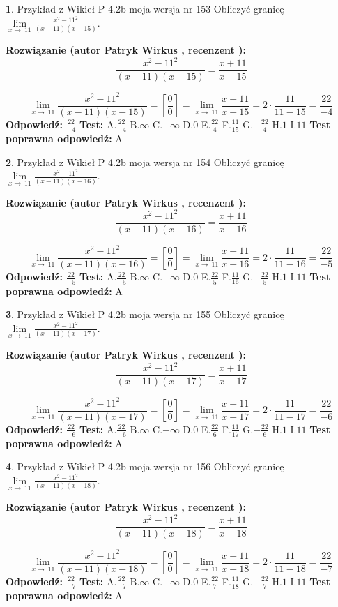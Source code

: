 \documentclass[12pt, a4paper]{article}
\theoremstyle{definition} %
\newtheorem{zad}{}
\newcommand{\zadStart}[1]{\begin{zad}#1\newline}
\newcommand{\zadStop}{\end{zad}}
\newcommand{\rozwStart}[2]{\noindent \textbf{Rozwiązanie (autor #1 , recenzent #2): }\newline}
\newcommand{\rozwStop}{\newline}
\newcommand{\odpStart}{\noindent \textbf{Odpowiedź:}\newline}
\newcommand{\odpStop}{\newline}
\newcommand{\testStart}{\noindent \textbf{Test:}\newline}
\newcommand{\testStop}{\newline}
\newcommand{\kluczStart}{\noindent \textbf{Test poprawna odpowiedź:}\newline}
\newcommand{\kluczStop}{\newline}
\begin{document}
\zadStart{Przykład z Wikieł P 4.2b moja wersja nr 153}
Obliczyć granicę $\lim\limits_{x\to\ 11}\frac{x^{2}-11^{2}}{(x-11)(x-15)}$.
\zadStop
\rozwStart{Patryk Wirkus}{}
$$\frac{x^{2}-11^{2}}{(x-11)(x-15)}=\frac{x+11}{x-15}$$

$$\lim\limits_{x\to\ 11}\frac{x^{2}-11^{2}}{(x-11)(x-15)}=[\frac{0}{0}]=\lim\limits_{x\to\ 11}\frac{x+11}{x-15}=2 \cdot \frac{11}{11-15} = \frac{22}{-4}$$
\rozwStop
\odpStart
$\frac{22}{-4}$
\odpStop
\testStart
A.$\frac{22}{-4}$
B.$\infty$
C.$-\infty$
D.$0$
E.$\frac{22}{4}$
F.$\frac{11}{15}$
G.$-\frac{22}{4}$
H.$1$
I.$11$
\testStop
\kluczStart
A
\kluczStop



\zadStart{Przykład z Wikieł P 4.2b moja wersja nr 154}
Obliczyć granicę $\lim\limits_{x\to\ 11}\frac{x^{2}-11^{2}}{(x-11)(x-16)}$.
\zadStop
\rozwStart{Patryk Wirkus}{}
$$\frac{x^{2}-11^{2}}{(x-11)(x-16)}=\frac{x+11}{x-16}$$

$$\lim\limits_{x\to\ 11}\frac{x^{2}-11^{2}}{(x-11)(x-16)}=[\frac{0}{0}]=\lim\limits_{x\to\ 11}\frac{x+11}{x-16}=2 \cdot \frac{11}{11-16} = \frac{22}{-5}$$
\rozwStop
\odpStart
$\frac{22}{-5}$
\odpStop
\testStart
A.$\frac{22}{-5}$
B.$\infty$
C.$-\infty$
D.$0$
E.$\frac{22}{5}$
F.$\frac{11}{16}$
G.$-\frac{22}{5}$
H.$1$
I.$11$
\testStop
\kluczStart
A
\kluczStop



\zadStart{Przykład z Wikieł P 4.2b moja wersja nr 155}
Obliczyć granicę $\lim\limits_{x\to\ 11}\frac{x^{2}-11^{2}}{(x-11)(x-17)}$.
\zadStop
\rozwStart{Patryk Wirkus}{}
$$\frac{x^{2}-11^{2}}{(x-11)(x-17)}=\frac{x+11}{x-17}$$

$$\lim\limits_{x\to\ 11}\frac{x^{2}-11^{2}}{(x-11)(x-17)}=[\frac{0}{0}]=\lim\limits_{x\to\ 11}\frac{x+11}{x-17}=2 \cdot \frac{11}{11-17} = \frac{22}{-6}$$
\rozwStop
\odpStart
$\frac{22}{-6}$
\odpStop
\testStart
A.$\frac{22}{-6}$
B.$\infty$
C.$-\infty$
D.$0$
E.$\frac{22}{6}$
F.$\frac{11}{17}$
G.$-\frac{22}{6}$
H.$1$
I.$11$
\testStop
\kluczStart
A
\kluczStop



\zadStart{Przykład z Wikieł P 4.2b moja wersja nr 156}
Obliczyć granicę $\lim\limits_{x\to\ 11}\frac{x^{2}-11^{2}}{(x-11)(x-18)}$.
\zadStop
\rozwStart{Patryk Wirkus}{}
$$\frac{x^{2}-11^{2}}{(x-11)(x-18)}=\frac{x+11}{x-18}$$

$$\lim\limits_{x\to\ 11}\frac{x^{2}-11^{2}}{(x-11)(x-18)}=[\frac{0}{0}]=\lim\limits_{x\to\ 11}\frac{x+11}{x-18}=2 \cdot \frac{11}{11-18} = \frac{22}{-7}$$
\rozwStop
\odpStart
$\frac{22}{-7}$
\odpStop
\testStart
A.$\frac{22}{-7}$
B.$\infty$
C.$-\infty$
D.$0$
E.$\frac{22}{7}$
F.$\frac{11}{18}$
G.$-\frac{22}{7}$
H.$1$
I.$11$
\testStop
\kluczStart
A
\kluczStop
\end{document}
